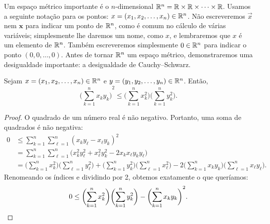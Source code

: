 Um espaço métrico importante é o
\emph{} $n$-dimensional
${\mathbb{R}}^n = {\mathbb{R}} \times {\mathbb{R}} \times \cdots \times {\mathbb{R}}$. Usamos a seguinte notação
para os pontos: $x =(x_1,x_2,\ldots,x_n) \in {\mathbb{R}}^n$. Não escreveremos
$\vec{x}$ nem $\mathbf{x}$ para indicar um ponto de ${\mathbb{R}}^n$, como é comum no
cálculo de várias variáveis; simplesmente lhe daremos um nome, como $x$, e
lembraremos que $x$ é um elemento de ${\mathbb{R}}^n$.
Também escreveremos simplesmente $0 \in {\mathbb{R}}^n$ para indicar o ponto
$(0,0,\ldots,0)$. Antes de tornar ${\mathbb{R}}^n$ um espaço métrico, demonstraremos
uma desigualdade importante: a desigualdade de Cauchy--Schwarz.

\begin{lemma}
Sejam $x =(x_1,x_2,\ldots,x_n) \in {\mathbb{R}}^n$ e $y =(y_1,y_2,\ldots,y_n) \in {\mathbb{R}}^n$.
Então,
\begin{equation*}
{\biggl( \sum_{k=1}^n x_k y_k \biggr)}^2
\leq
\biggl(\sum_{k=1}^n x_k^2 \biggr)
\biggl(\sum_{k=1}^n y_k^2 \biggr) .
\end{equation*}
\end{lemma}

\begin{proof}
O quadrado de um número real é não negativo. Portanto, uma soma de quadrados
é não negativa:
\begin{equation*}
\begin{split}
0 & \leq 
\sum_{k=1}^n \sum_{\ell=1}^n {(x_k y_\ell - x_\ell y_k)}^2
\\
& =
\sum_{k=1}^n \sum_{\ell=1}^n \bigl( x_k^2 y_\ell^2 + x_\ell^2 y_k^2 - 2 x_k
x_\ell y_k
y_\ell \bigr)
\\
& =
\biggl( \sum_{k=1}^n x_k^2 \biggr)
\biggl( \sum_{\ell=1}^n y_\ell^2 \biggr)
+
\biggl( \sum_{k=1}^n y_k^2 \biggr)
\biggl( \sum_{\ell=1}^n x_\ell^2 \biggr)
-
2
\biggl( \sum_{k=1}^n x_k y_k \biggr)
\biggl( \sum_{\ell=1}^n x_\ell y_\ell \biggr) .
\end{split}
\end{equation*}
Renomeando os índices e dividindo por 2, obtemos exatamente o que queríamos:
\begin{equation*}
0 \leq 
\biggl( \sum_{k=1}^n x_k^2 \biggr)
\biggl( \sum_{k=1}^n y_k^2 \biggr)
-
{\biggl( \sum_{k=1}^n x_k y_k \biggr)}^2 .
\qedhere
\end{equation*}
\end{proof}

